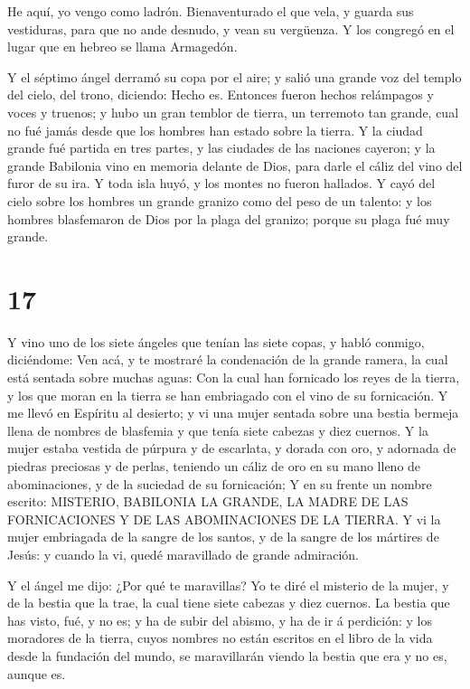  He aquí, yo vengo como ladrón. Bienaventurado el que vela,
y guarda sus vestiduras, para que no ande desnudo, y vean su vergüenza.
 Y los congregó en el lugar que en hebreo se llama
Armagedón.

 Y el séptimo ángel derramó su copa por el aire; y salió
una grande voz del templo del cielo, del trono, diciendo: Hecho es.
 Entonces fueron hechos relámpagos y voces y truenos; y
hubo un gran temblor de tierra, un terremoto tan grande, cual no fué
jamás desde que los hombres han estado sobre la tierra.  Y
la ciudad grande fué partida en tres partes, y las ciudades de las
naciones cayeron; y la grande Babilonia vino en memoria delante de Dios,
para darle el cáliz del vino del furor de su ira.  Y toda
isla huyó, y los montes no fueron hallados.  Y cayó del
cielo sobre los hombres un grande granizo como del peso de un talento: y
los hombres blasfemaron de Dios por la plaga del granizo; porque su
plaga fué muy grande.

\hypertarget{section-16}{%
\section{17}\label{section-16}}

 Y vino uno de los siete ángeles que tenían las siete copas,
y habló conmigo, diciéndome: Ven acá, y te mostraré la condenación de la
grande ramera, la cual está sentada sobre muchas aguas:  Con
la cual han fornicado los reyes de la tierra, y los que moran en la
tierra se han embriagado con el vino de su fornicación.  Y
me llevó en Espíritu al desierto; y vi una mujer sentada sobre una
bestia bermeja llena de nombres de blasfemia y que tenía siete cabezas y
diez cuernos.  Y la mujer estaba vestida de púrpura y de
escarlata, y dorada con oro, y adornada de piedras preciosas y de
perlas, teniendo un cáliz de oro en su mano lleno de abominaciones, y de
la suciedad de su fornicación;  Y en su frente un nombre
escrito: MISTERIO, BABILONIA LA GRANDE, LA MADRE DE LAS FORNICACIONES Y
DE LAS ABOMINACIONES DE LA TIERRA.  Y vi la mujer embriagada
de la sangre de los santos, y de la sangre de los mártires de Jesús: y
cuando la vi, quedé maravillado de grande admiración.

 Y el ángel me dijo: ¿Por qué te maravillas? Yo te diré el
misterio de la mujer, y de la bestia que la trae, la cual tiene siete
cabezas y diez cuernos.  La bestia que has visto, fué, y no
es; y ha de subir del abismo, y ha de ir á perdición: y los moradores de
la tierra, cuyos nombres no están escritos en el libro de la vida desde
la fundación del mundo, se maravillarán viendo la bestia que era y no
es, aunque es.

